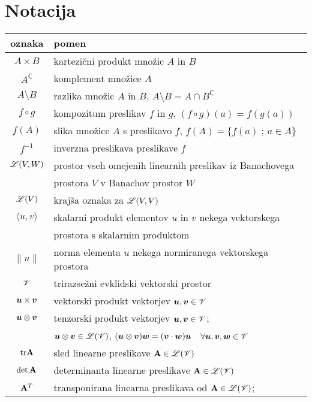 \chapter*{Notacija} \thispagestyle{empty}


\begin{center}\begin{tabular}[h]{|c|p{11cm}|}
	\hline oznaka & pomen \\ \hline%
	$A\times B$ & kartezični produkt množic $A$ in $B$ \\ %
	$A^{\mathsf C}$ & komplement množice $A$ \\ %
	$A\setminus B$ & razlika množic $A$ in $B$, $A\setminus B=A\cap B^{\mathsf C}$ \\ %
	$f\circ g$ & kompozitum preslikav $f$ in $g$, $(f\circ g)(a)=f(g(a))$ \\ %
	$f(A)$ & slika množice $A$ s preslikavo $f$, $f(A)=\{f(a)\;;\ a\in A\}$ \\ %
	$f^{-1}$ & inverzna preslikava preslikave $f$ \\ %
	$\mathscr L(V,W)$ & prostor vseh omejenih linearnih preslikav iz Banachovega \\ &
	prostora $V$ v Banachov prostor $W$ \\ %
	$\mathscr L(V)$ & krajša oznaka za $\mathscr L(V,V)$ \\ %
	$\langle u,v\rangle$ & skalarni produkt elementov $u$ in $v$ nekega vektorskega \\ &
	prostora s skalarnim produktom \\ %
	$\|u\|$ & norma elementa $u$ nekega normiranega vektorskega prostora \\ %
	$\mathscr V$ & trirazsežni evklidski vektorski prostor \\ %
	$\boldsymbol u\times\boldsymbol v$ & vektorski produkt vektorjev $\boldsymbol u,\boldsymbol v\in\mathscr V$ \\ %
	$\boldsymbol u\otimes\boldsymbol v$ & tenzorski produkt vektorjev $\boldsymbol u,\boldsymbol v\in\mathscr V$; \\
	& $\boldsymbol u\otimes\boldsymbol v\in\mathscr L(\mathscr V)$, $(\boldsymbol u\otimes\boldsymbol v)\boldsymbol w=
	(\boldsymbol v\cdot\boldsymbol w)\boldsymbol u$ \ $\forall\boldsymbol u,\boldsymbol v,\boldsymbol w\in\mathscr V$ \\ %
	$\mathrm{tr}\mathbf A$ & sled linearne preslikave $\mathbf A\in\mathscr L(\mathscr V)$ \\ %
	$\det\mathbf A$ & determinanta linearne preslikave $\mathbf A\in\mathscr L(\mathscr V)$ \\ %
	$\mathbf A^{T}$ & transponirana linearna preslikava od $\mathbf A\in\mathscr L(\mathscr V)$; \\

\end{tabular}
\end{center}
